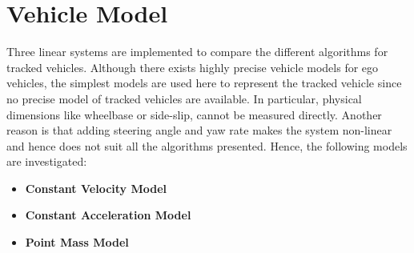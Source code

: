 \section{Vehicle Model}
Three linear systems are implemented to compare the different algorithms for tracked vehicles. Although there exists highly precise vehicle models for ego vehicles, the simplest models are used here to represent the tracked vehicle since no precise model of tracked vehicles are available. In particular, physical dimensions like wheelbase or side-slip, cannot be measured directly. Another reason is that adding steering angle and yaw rate makes the system non-linear and hence does not suit all the algorithms presented. Hence, the following models are investigated:
\begin{itemize}
\item \textbf{Constant Velocity Model}
\item \textbf{Constant Acceleration Model}
\item \textbf{Point Mass Model}
\end{itemize}
